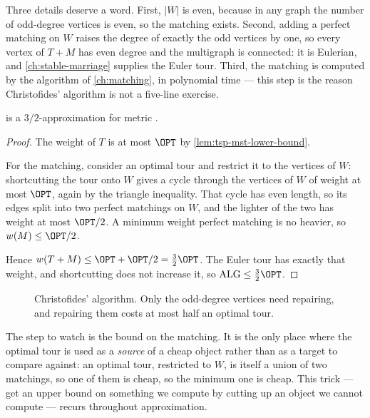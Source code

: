 Three details deserve a word. First, $|W|$ is even, because in any graph the
number of odd-degree vertices is even, so the matching exists. Second, adding a
perfect matching on $W$ raises the degree of exactly the odd vertices by one, so
every vertex of $T+M$ has even degree and the multigraph is connected: it is
Eulerian, and \cref{ch:stable-marriage} supplies the Euler tour. Third, the
matching is computed by the algorithm of \cref{ch:matching}, in polynomial
time --- this step is the reason Christofides' algorithm is not a five-line
exercise.

\begin{theorem}\label{thm:christofides}
 is a $3/2$-approximation for metric .
\end{theorem}

\begin{proof}
The weight of $T$ is at most $\OPT$ by \cref{lem:tsp-mst-lower-bound}.

For the matching, consider an optimal tour and restrict it to the vertices of
$W$: shortcutting the tour onto $W$ gives a cycle through the vertices of $W$
of weight at most $\OPT$, again by the triangle inequality. That cycle has even
length, so its edges split into two perfect matchings on $W$, and the lighter of
the two has weight at most $\OPT/2$. A minimum weight perfect matching is no
heavier, so $w(M) \le \OPT/2$.

Hence $w(T+M) \le \OPT + \OPT/2 = \tfrac32 \OPT$. The Euler tour has exactly
that weight, and shortcutting does not increase it, so
$\mathrm{ALG} \le \tfrac32\OPT$.
\end{proof}

\begin{figure}[ht]
\centering
{}
\caption{Christofides' algorithm. Only the odd-degree vertices need repairing,
and repairing them costs at most half an optimal tour.}
\label{fig:christofides}
\end{figure}

\begin{intuition}
The step to watch is the bound on the matching. It is the only place where the
optimal tour is used as a \emph{source} of a cheap object rather than as a
target to compare against: an optimal tour, restricted to $W$, is itself a
union of two matchings, so one of them is cheap, so the minimum one is cheap.
This trick --- get an upper bound on something we compute by cutting up an
object we cannot compute --- recurs throughout approximation.
\end{intuition}

